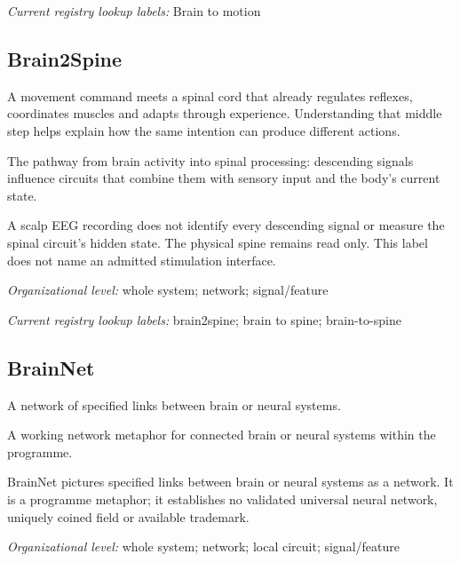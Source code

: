 \noindent\textit{Current registry lookup labels:} Brain to motion\par

\begin{samepage}
\subsection*{Brain2Spine}
\noindent A movement command meets a spinal cord that already regulates reflexes, coordinates muscles and adapts through experience. Understanding that middle step helps explain how the same intention can produce different actions.\par
\end{samepage}
\noindent The pathway from brain activity into spinal processing: descending signals influence circuits that combine them with sensory input and the body's current state.\par
\noindent A scalp EEG recording does not identify every descending signal or measure the spinal circuit's hidden state. The physical spine remains read only. This label does not name an admitted stimulation interface.\par
\begin{samepage}
\noindent\textit{Organizational level:} whole system; network; signal/feature\par\nopagebreak[4]

\end{samepage}


\noindent\textit{Current registry lookup labels:} brain2spine; brain to spine; brain-to-spine\par

\begin{samepage}
\subsection*{BrainNet}
\noindent A network of specified links between brain or neural systems.\par
\end{samepage}
\noindent A working network metaphor for connected brain or neural systems within the programme.\par
\noindent BrainNet pictures specified links between brain or neural systems as a network. It is a programme metaphor; it establishes no validated universal neural network, uniquely coined field or available trademark.\par
\begin{samepage}
\noindent\textit{Organizational level:} whole system; network; local circuit; signal/feature\par\nopagebreak[4]

\end{samepage}



